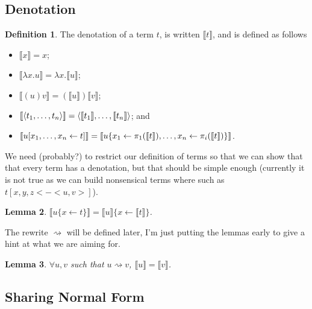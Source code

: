 \documentclass[11pt,a4paper]{article}
\theoremstyle{definition}
\newtheorem{definition}{Definition}
\theoremstyle{plain}
\newtheorem{lemma}[definition]{Lemma}
\theoremstyle{remark}
\begin{document}

\subsection{Denotation}

\newcommand{\terden}[1]{{\llbracket{#1}\rrbracket}}
\newcommand{\tersubn}[5]{{{#1}\{{#2}\leftarrow{#3},\dots,{#4}\leftarrow{#5}\}}}

\begin{definition}
	The denotation of a term $t$, is written $\terden{t}$, and is defined as follows
	\begin{itemize}
		\item $\terden{x}=x$;
		\item $\terden{\lambda x. u}=\lambda x.\terden{u}$;
		\item $\terden{(u)v}=(\terden{u})\terden{v}$;
		\item $\terden{\tertuple{t_1}{t_n}}=\tertuple{\terden{t_1}}{\terden{t_n}}$; and
		\item $\terden{\tershare{u}{x_1}{x_n}{t}}=\terden{\tersubn{u}{x_1}{\terpr{1}{\terden{t}}}{x_n}{\terpr{i}{\terden{t}}}}$.
\end{itemize}
\end{definition}

We need (probably?) to restrict our definition of terms so that we can show that that every term has a denotation, but that should be simple enough (currently it is not true as we can build nonsensical terms where such as $t[x,y,z <- <u,v>]$).

\begin{lemma}
	$\terden{u\{x\leftarrow t\}}=\terden{u}\{x\leftarrow\terden{t}\}$.
\end{lemma}

The rewrite $\rightsquigarrow$ will be defined later, I'm just putting the lemmas early to give a hint at what we are aiming for.

\begin{lemma}
$\forall u,v$ such that $u\rightsquigarrow v$, $\terden{u}=\terden{v}$.
\end{lemma}

\subsection{Sharing Normal Form}
\end{document}
